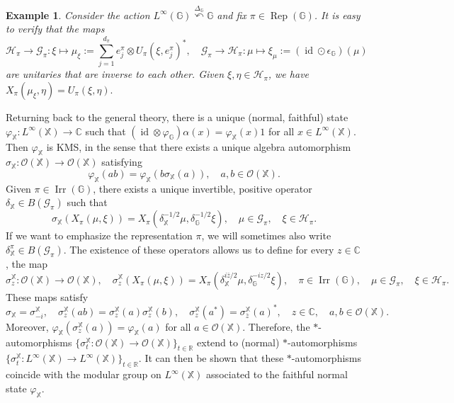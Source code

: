 \documentclass[reqno]{amsart}
\numberwithin{equation}{section}
\newtheorem{Exa}[Theorem]{Example}
\DeclareMathOperator{\id}{\mathrm{id}}
\DeclareMathOperator{\Rep}{\mathrm{Rep}}
\DeclareMathOperator{\Irr}{\mathrm{Irr}}
\newcommand{\mcG}{\mathcal{G}}
\newcommand{\mcH}{\mathcal{H}}
\newcommand{\mcO}{\mathcal{O}}
\newcommand{\C}{\mathbb{C}}
\newcommand{\G}{\mathbb{G}}
\newcommand{\R}{\mathbb{R}}
\newcommand{\X}{\mathbb{X}}
\begin{document}
\begin{Exa}\label{exmatrixcoeff}
    Consider the action $ L^\infty(\G)\stackrel{\Delta_\G}\curvearrowleft \G$ and fix $\pi \in \Rep(\G)$. It is easy to verify that the maps
    \begin{equation}\label{unitary}
        \mcH_\pi\to \mcG_\pi: \xi \mapsto \mu_\xi:= \sum_{j=1}^{d_\pi} e_j^\pi\otimes U_\pi(\xi, e_j^\pi)^*, \quad \mcG_\pi\to \mcH_\pi: \mu \mapsto \xi_\mu:= (\id \odot \epsilon_\G)(\mu)
    \end{equation}
    are unitaries that are inverse to each other. Given $\xi, \eta \in \mcH_\pi$, we have
    $X_\pi(\mu_\xi, \eta)=U_\pi(\xi, \eta).$
\end{Exa}
Returning back to the general theory, there is a unique (normal, faithful) state $\varphi_\X: L^\infty(\X)\to \C$ such that $(\id \otimes \varphi_\G)\alpha(x)= \varphi_\X(x)1$ for all $x\in L^\infty(\X)$. Then $\varphi_\X$ is KMS, in the sense that there exists a  unique algebra automorphism $\sigma_\X: \mcO(\X)\to \mcO(\X)$ satisfying
\begin{equation}\label{KMS}\varphi_\X(ab)= \varphi_\X(b\sigma_\X(a)), \quad a,b\in \mcO(\X).\end{equation}
Given $\pi \in \Irr(\G)$, there exists a unique invertible, positive operator $\delta_\X\in B(\mcG_\pi)$ such that 
\begin{equation}\label{determines uniquely}
    \sigma_\X(X_\pi(\mu, \xi))= X_\pi(\delta_\X^{-1/2}\mu, \delta_\G^{-1/2}\xi), \quad \mu \in \mcG_\pi, \quad \xi \in \mcH_\pi.
\end{equation}
If we want to emphasize the representation $\pi$, we will sometimes also write $\delta_\X^\pi\in B(\mcG_\pi)$. The existence of these operators allows us to define for every $z\in \C$, the map
\begin{equation}\label{modularanalytic}
    \sigma_z^\X: \mcO(\X)\to \mcO(\X), \quad  \sigma_z^\X(X_\pi(\mu, \xi))= X_\pi(\delta_\X^{i\bar{z}/2}\mu, \delta_\G^{-iz/2}\xi),\quad \pi \in \Irr(\G), \quad \mu \in \mcG_\pi, \quad \xi \in \mcH_\pi.
\end{equation}
These maps satisfy
$$\sigma_{\X}= \sigma_{-i}^\X, \quad \sigma_z^\X(ab)= \sigma_z^\X(a)\sigma_z^\X(b), \quad \sigma_z^\X(a^*)= \sigma_{\bar{z}}^\X(a)^*, \quad z\in \C, \quad a,b\in \mcO(\X).$$
Moreover, $\varphi_\X(\sigma_z^\X(a))=\varphi_\X(a)$ for all $a\in \mcO(\X)$. Therefore, the $*$-automorphisms
$\{\sigma_t^\X: \mcO(\X)\to \mcO(\X)\}_{t\in \R}$ extend to (normal) $*$-automorphisms
$\{\sigma_t^\X: L^\infty(\X)\to L^\infty(\X)\}_{t\in \R}.$
It can then be shown that these $*$-automorphisms coincide with the modular group on $L^\infty(\X)$ associated to the faithful normal state $\varphi_\X$.
\end{document}
